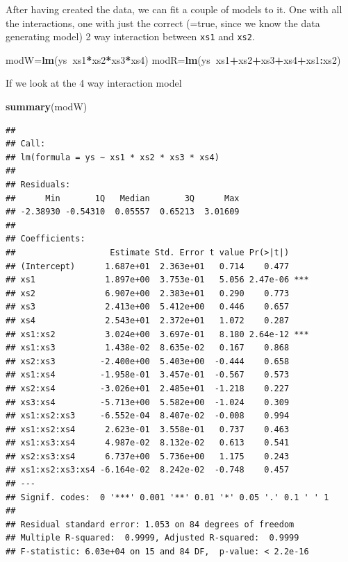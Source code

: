 \documentclass[
]{book}
\newenvironment{Shaded}{\begin{snugshade}}{\end{snugshade}}
\newcommand{\KeywordTok}[1]{\textcolor[rgb]{0.13,0.29,0.53}{\textbf{#1}}}
\newcommand{\NormalTok}[1]{#1}
\newcommand{\OperatorTok}[1]{\textcolor[rgb]{0.81,0.36,0.00}{\textbf{#1}}}
\begin{document}
After having created the data, we can fit a couple of models to it. One with all the interactions, one with just the correct (=true, since we know the data generating model) 2 way interaction between \texttt{xs1} and \texttt{xs2}.

\begin{Shaded}
\begin{Highlighting}[]
\NormalTok{modW=}\KeywordTok{lm}\NormalTok{(ys}\OperatorTok{~}\NormalTok{xs1}\OperatorTok{*}\NormalTok{xs2}\OperatorTok{*}\NormalTok{xs3}\OperatorTok{*}\NormalTok{xs4)}
\NormalTok{modR=}\KeywordTok{lm}\NormalTok{(ys}\OperatorTok{~}\NormalTok{xs1}\OperatorTok{+}\NormalTok{xs2}\OperatorTok{+}\NormalTok{xs3}\OperatorTok{+}\NormalTok{xs4}\OperatorTok{+}\NormalTok{xs1}\OperatorTok{:}\NormalTok{xs2)}
\end{Highlighting}
\end{Shaded}

If we look at the 4 way interaction model

\begin{Shaded}
\begin{Highlighting}[]
\KeywordTok{summary}\NormalTok{(modW)}
\end{Highlighting}
\end{Shaded}

\begin{verbatim}
## 
## Call:
## lm(formula = ys ~ xs1 * xs2 * xs3 * xs4)
## 
## Residuals:
##      Min       1Q   Median       3Q      Max 
## -2.38930 -0.54310  0.05557  0.65213  3.01609 
## 
## Coefficients:
##                   Estimate Std. Error t value Pr(>|t|)    
## (Intercept)      1.687e+01  2.363e+01   0.714    0.477    
## xs1              1.897e+00  3.753e-01   5.056 2.47e-06 ***
## xs2              6.907e+00  2.383e+01   0.290    0.773    
## xs3              2.413e+00  5.412e+00   0.446    0.657    
## xs4              2.543e+01  2.372e+01   1.072    0.287    
## xs1:xs2          3.024e+00  3.697e-01   8.180 2.64e-12 ***
## xs1:xs3          1.438e-02  8.635e-02   0.167    0.868    
## xs2:xs3         -2.400e+00  5.403e+00  -0.444    0.658    
## xs1:xs4         -1.958e-01  3.457e-01  -0.567    0.573    
## xs2:xs4         -3.026e+01  2.485e+01  -1.218    0.227    
## xs3:xs4         -5.713e+00  5.582e+00  -1.024    0.309    
## xs1:xs2:xs3     -6.552e-04  8.407e-02  -0.008    0.994    
## xs1:xs2:xs4      2.623e-01  3.558e-01   0.737    0.463    
## xs1:xs3:xs4      4.987e-02  8.132e-02   0.613    0.541    
## xs2:xs3:xs4      6.737e+00  5.736e+00   1.175    0.243    
## xs1:xs2:xs3:xs4 -6.164e-02  8.242e-02  -0.748    0.457    
## ---
## Signif. codes:  0 '***' 0.001 '**' 0.01 '*' 0.05 '.' 0.1 ' ' 1
## 
## Residual standard error: 1.053 on 84 degrees of freedom
## Multiple R-squared:  0.9999,	Adjusted R-squared:  0.9999 
## F-statistic: 6.03e+04 on 15 and 84 DF,  p-value: < 2.2e-16
\end{verbatim}
\end{document}
